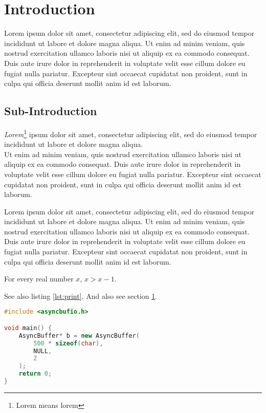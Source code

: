 \documentclass{umb_thesis}
\begin{document}
\cleardoublepage
\tableofcontents

\cleardoublepage
\section{Introduction} \label{01_introduction}
Lorem ipsum dolor sit amet, consectetur adipiscing elit, sed do eiusmod tempor incididunt ut labore et dolore magna aliqua. Ut enim ad minim veniam, quis nostrud exercitation ullamco laboris nisi ut aliquip ex ea commodo consequat. Duis aute irure dolor in reprehenderit in voluptate velit esse cillum dolore eu fugiat nulla pariatur. Excepteur sint occaecat cupidatat non proident, sunt in culpa qui officia deserunt mollit anim id est laborum.
\cite{maggiore2012virtual}
\cite{baumgarte1983new}

\subsection{Sub-Introduction}
\textit{Lorem}\footnote{Lorem means lorem} ipsum dolor sit amet, consectetur adipiscing elit, sed do eiusmod tempor incididunt ut labore et dolore magna aliqua.
\\
Ut enim ad minim veniam, quis nostrud exercitation ullamco laboris nisi ut aliquip ex ea commodo consequat. Duis aute irure dolor in reprehenderit in voluptate velit esse cillum dolore eu fugiat nulla pariatur. Excepteur sint occaecat cupidatat non proident, sunt in culpa qui officia deserunt mollit anim id est laborum.

Lorem ipsum dolor sit amet, consectetur adipiscing elit, sed do eiusmod tempor incididunt ut labore et dolore magna aliqua. Ut enim ad minim veniam, quis nostrud exercitation ullamco laboris nisi ut aliquip ex ea commodo consequat. Duis aute irure dolor in reprehenderit in voluptate velit esse cillum dolore eu fugiat nulla pariatur. Excepteur sint occaecat cupidatat non proident, sunt in culpa qui officia deserunt mollit anim id est laborum.

\begin{theorem}
For every real number $x$, $x > x - 1$.
\end{theorem}

See also listing \ref{lst:print}. And also see section \ref{01_introduction}.

\begin{lstlisting}[language=C++, caption={Code listing. If you disable color, it will be all in black and white.}, label={lst:print}]
#include <asyncbufio.h>

void main() {
    AsyncBuffer* b = new AsyncBuffer(
        500 * sizeof(char), 
        NULL, 
        2
    );
    return 0;
}
\end{lstlisting}
\end{document}
